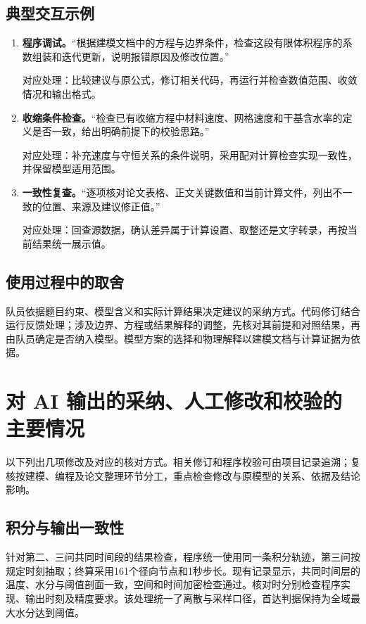\documentclass[withoutpreface,bwprint]{commons/cumcmthesis}
\newenvironment{promptblock}{\begin{minipage}[t]{\linewidth}\setlength{\parindent}{0pt}}{\end{minipage}}
\begin{document}
\subsection{典型交互示例}
\begin{enumerate}[label=\textbf{（\arabic*）}]
  \item \begin{promptblock}\textbf{程序调试。}“根据建模文档中的方程与边界条件，检查这段有限体积程序的系数组装和迭代更新，说明报错原因及修改位置。”

  对应处理：比较建议与原公式，修订相关代码，再运行并检查数值范围、收敛情况和输出格式。
  \end{promptblock}

  \item \begin{promptblock}\textbf{收缩条件检查。}“检查已有收缩方程中材料速度、网格速度和干基含水率的定义是否一致，给出明确前提下的校验思路。”

  对应处理：补充速度与守恒关系的条件说明，采用配对计算检查实现一致性，并保留模型适用范围。
  \end{promptblock}

  \item \begin{promptblock}\textbf{一致性复查。}“逐项核对论文表格、正文关键数值和当前计算文件，列出不一致的位置、来源及建议修正值。”

  对应处理：回查源数据，确认差异属于计算设置、取整还是文字转录，再按当前结果统一展示值。
  \end{promptblock}
\end{enumerate}

\subsection{使用过程中的取舍}
队员依据题目约束、模型含义和实际计算结果决定建议的采纳方式。代码修订结合运行反馈处理；涉及边界、方程或结果解释的调整，先核对其前提和对照结果，再由队员确定是否纳入模型。模型方案的选择和物理解释以建模文档与计算证据为依据。

\section{对 AI 输出的采纳、人工修改和校验的主要情况}
以下列出几项修改及对应的核对方式。相关修订和程序校验可由项目记录追溯；复核按建模、编程及论文整理环节分工，重点检查修改与原模型的关系、依据及结论影响。

\subsection{积分与输出一致性}
针对第二、三问共同时间段的结果检查，程序统一使用同一条积分轨迹，第三问按规定时刻抽取；终算采用161个径向节点和1秒步长。现有记录显示，共同时间层的温度、水分与阈值剖面一致，空间和时间加密检查通过。核对时分别检查程序实现、输出时刻及精度要求。该处理统一了离散与采样口径，首达判据保持为全域最大水分达到阈值。
\end{document}
